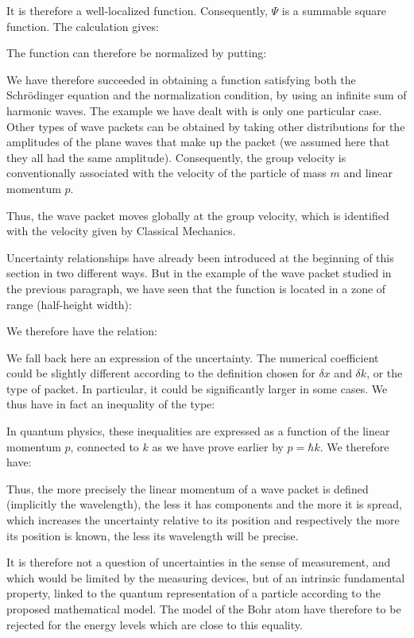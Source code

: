 	It is therefore a well-localized function. Consequently, $\Psi$ is a summable square function. The calculation gives:
	
	The function can therefore be normalized by putting:
	
	We have therefore succeeded in obtaining a function satisfying both the Schrödinger equation and the normalization condition, by using an infinite sum of harmonic waves. The example we have dealt with is only one particular case. Other types of wave packets can be obtained by taking other distributions for the amplitudes of the plane waves that make up the packet (we assumed here that they all had the same amplitude). Consequently, the group velocity is conventionally associated with the velocity of the particle of mass $m$ and linear momentum $p$.

	Thus, the wave packet moves globally at the group velocity, which is identified with the velocity given by Classical Mechanics.

	Uncertainty relationships have already been introduced at the beginning of this section in two different ways. But in the example of the wave packet studied in the previous paragraph, we have seen that the function is located in a zone of range (half-height width):
	
	We therefore have the relation:
	
	We fall back here an expression of the uncertainty. The numerical coefficient could be slightly different according to the definition chosen for $\delta x$ and $\delta k$, or the type of packet. In particular, it could be significantly larger in some cases. We thus have in fact an inequality of the type:
	
	In quantum physics, these inequalities are expressed as a function of the linear momentum $p$, connected to $k$ as we have prove earlier by $p=\hbar k$. We therefore have:
	
	Thus, the more precisely the linear momentum of a wave packet is defined (implicitly the wavelength), the less it has components and the more it is spread, which increases the uncertainty relative to its position and respectively the more its position is known, the less its wavelength will be precise.

	It is therefore not a question of uncertainties in the sense of measurement, and which would be limited by the measuring devices, but of an intrinsic fundamental property, linked to the quantum representation of a particle according to the proposed mathematical model. The model of the Bohr atom have therefore to be rejected for the energy levels which are close to this equality.

